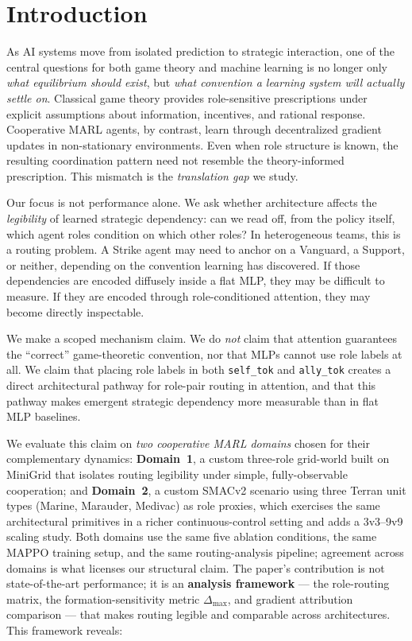 \section{Introduction}
\label{sec:introduction}

As AI systems move from isolated prediction to strategic interaction, one of the central questions for both game theory and machine learning is no longer only \emph{what equilibrium should exist}, but \emph{what convention a learning system will actually settle on}. Classical game theory provides role-sensitive prescriptions under explicit assumptions about information, incentives, and rational response. Cooperative MARL agents, by contrast, learn through decentralized gradient updates in non-stationary environments. Even when role structure is known, the resulting coordination pattern need not resemble the theory-informed prescription. This mismatch is the \emph{translation gap} we study.

Our focus is not performance alone. We ask whether architecture affects the \emph{legibility} of learned strategic dependency: can we read off, from the policy itself, which agent roles condition on which other roles? In heterogeneous teams, this is a routing problem. A Strike agent may need to anchor on a Vanguard, a Support, or neither, depending on the convention learning has discovered. If those dependencies are encoded diffusely inside a flat MLP, they may be difficult to measure. If they are encoded through role-conditioned attention, they may become directly inspectable.

We make a scoped mechanism claim. We do \emph{not} claim that attention guarantees the ``correct'' game-theoretic convention, nor that MLPs cannot use role labels at all. We claim that placing role labels in both \texttt{self\_tok} and \texttt{ally\_tok} creates a direct architectural pathway for role-pair routing in attention, and that this pathway makes emergent strategic dependency more measurable than in flat MLP baselines.

We evaluate this claim on \emph{two cooperative MARL domains} chosen for their complementary dynamics: \textbf{Domain~1}, a custom three-role grid-world built on MiniGrid that isolates routing legibility under simple, fully-observable cooperation; and \textbf{Domain~2}, a custom SMACv2 scenario using three Terran unit types (Marine, Marauder, Medivac) as role proxies, which exercises the same architectural primitives in a richer continuous-control setting and adds a 3v3--9v9 scaling study. Both domains use the same five ablation conditions, the same MAPPO training setup, and the same routing-analysis pipeline; agreement across domains is what licenses our structural claim. The paper's contribution is not state-of-the-art performance; it is an \textbf{analysis framework} --- the role-routing matrix, the formation-sensitivity metric $\Delta_{\max}$, and gradient attribution comparison --- that makes routing legible and comparable across architectures. This framework reveals:

